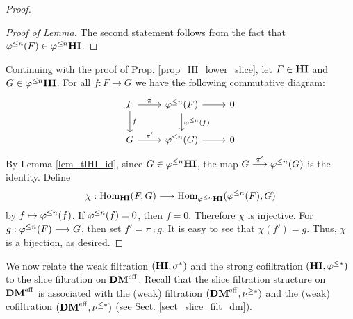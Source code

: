 \begin{proof}
\begin{proof}[Proof of Lemma]
The second statement follows from the fact that $\varphi^{\leq n}(F) \in 
\varphi^{\leq n}\mathbf{HI}$.
\end{proof}

Continuing with the proof of Prop. \ref{prop_HI_lower_slice}, let
$F \in \mathbf{HI}$ and $G \in \varphi^{\leq n}\mathbf{HI}$. For all $f: F \to G$ we have 
the following commutative diagram:
\[
\begin{tikzcd}
F \arrow{r}{\pi} \arrow{d}{f}
& \tlHI{n}(F) \arrow{r} \arrow{d}{\tlHI{n}(f)}
& 0 \\
G \arrow{r}{\pi'}
& \tlHI{n}(G) \arrow{r}
& 0
\end{tikzcd}
\]
By Lemma \ref{lem_tlHI_id}, since $G \in \varphi^{\leq n}\mathbf{HI}$, the map
$G \stackrel{\pi'}{\longrightarrow} \varphi^{\leq n}(G)$ is the identity. Define
\[
\chi : \mathrm{Hom}_{\mathbf{HI}}(F, G) \longrightarrow \mathrm{Hom}_{\varphi^{\leq n}\mathbf{HI}}(\varphi^{\leq n}(F), G)
\]
by $f \mapsto \varphi^{\leq n}(f)$. If $\varphi^{\leq n}(f) = 0$, then $f = 0$.
Therefore $\chi$ is injective. For $g: \varphi^{\leq n}(F) \longrightarrow G$, then
set $f' = \pi \comp g$. It is easy to see that $\chi(f') = g$.
Thus, $\chi$ is a bijection, as desired.
\end{proof}

We now relate the weak filtration $(\mathbf{HI}, \sigma^{*})$ and the strong 
cofiltration $(\mathbf{HI}, \varphi^{\leq *})$ to the slice filtration on 
$\mathbf{DM}^{\mathrm{eff}}$. Recall that the slice filtration structure on $\mathbf{DM}^{\mathrm{eff}}$ 
is associated with the (weak) filtration $(\mathbf{DM}^{\mathrm{eff}}, \nu^{\geq *})$ and 
the (weak) cofiltration $(\mathbf{DM}^{\mathrm{eff}}, \nu^{\leq *})$ (see Sect. 
\ref{sect_slice_filt_dm}).

